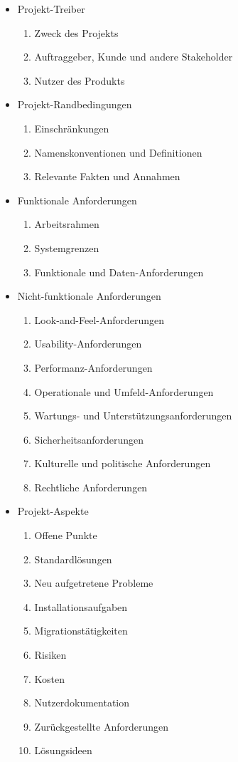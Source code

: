 \begin{minipage}{\linewidth}
	\begin{itemize}\label{abb:volereReqSpec}
		\item Projekt-Treiber
		\begin{enumerate}
			\item Zweck des Projekts
			\item Auftraggeber, Kunde und andere Stakeholder
			\item Nutzer des Produkts
		\end{enumerate}
		\item Projekt-Randbedingungen
		\begin{enumerate}
			\item Einschränkungen
			\item Namenskonventionen und Definitionen
			\item Relevante Fakten und Annahmen
		\end{enumerate}
		\item Funktionale Anforderungen
		\begin{enumerate}
			\item Arbeitsrahmen
			\item Systemgrenzen
			\item Funktionale und Daten-Anforderungen
		\end{enumerate}
		\item Nicht-funktionale Anforderungen
		\begin{enumerate}
			\item Look-and-Feel-Anforderungen
			\item Usability-Anforderungen
			\item Performanz-Anforderungen
			\item Operationale und Umfeld-Anforderungen
			\item Wartungs- und Unterstützungsanforderungen
			\item Sicherheitsanforderungen
			\item Kulturelle und politische Anforderungen
			\item Rechtliche Anforderungen
		\end{enumerate}
		\item Projekt-Aspekte
		\begin{enumerate}
			\item Offene Punkte
			\item Standardlösungen
			\item Neu aufgetretene Probleme
			\item Installationsaufgaben
			\item Migrationstätigkeiten
			\item Risiken
			\item Kosten
			\item Nutzerdokumentation
			\item Zurückgestellte Anforderungen
			\item Lösungsideen
		\end{enumerate}
	\end{itemize}
\end{minipage}


